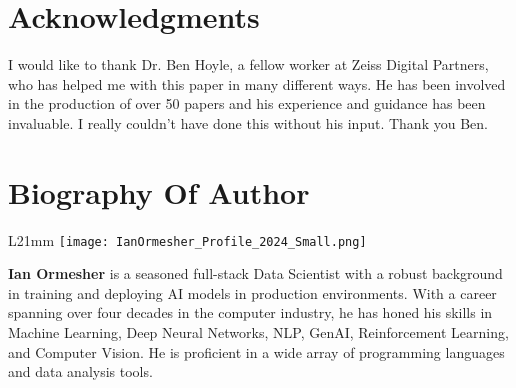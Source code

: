 \documentclass{article}
\begin{document}
\section*{Acknowledgments}
I would like to thank Dr. Ben Hoyle, a fellow worker at Zeiss Digital Partners, who has helped me with this paper in many different ways. He has been involved in the production of over 50 papers and his experience and guidance has been invaluable. I really couldn't have done this without his input. Thank you Ben.

  
  

\section*{Biography Of Author}
\begin{wrapfigure}{L}{21mm}
\vspace{-\intextsep}
\texttt{[image: IanOrmesher\_Profile\_2024\_Small.png]}
\end{wrapfigure} %
\textbf{Ian Ormesher}  is a seasoned full-stack Data Scientist with a robust background in training and deploying AI models in production environments. With a career spanning over four decades in the computer industry, he has honed his skills in Machine Learning, Deep Neural Networks, NLP, GenAI, Reinforcement Learning, and Computer Vision. He is proficient in a wide array of programming languages and data analysis tools.
\end{document}
